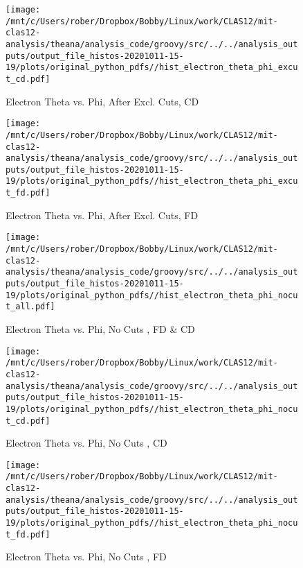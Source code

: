 \documentclass{article}
\begin{document}
\begin{landscape}
\begin{figure}[h]
        \texttt{[image: /mnt/c/Users/rober/Dropbox/Bobby/Linux/work/CLAS12/mit-clas12-analysis/theana/analysis\_code/groovy/src/../../analysis\_outputs/output\_file\_histos-20201011-15-19/plots/original\_python\_pdfs//hist\_electron\_theta\_phi\_excut\_cd.pdf]}
        \captionsetup{textformat=empty,labelformat=blank}
        \caption{Electron Theta vs. Phi, After Excl. Cuts, CD}
    \end{figure}
    \clearpage
    
    \begin{figure}[h]
        \centering

        \texttt{[image: /mnt/c/Users/rober/Dropbox/Bobby/Linux/work/CLAS12/mit-clas12-analysis/theana/analysis\_code/groovy/src/../../analysis\_outputs/output\_file\_histos-20201011-15-19/plots/original\_python\_pdfs//hist\_electron\_theta\_phi\_excut\_fd.pdf]}
        \captionsetup{textformat=empty,labelformat=blank}
        \caption{Electron Theta vs. Phi, After Excl. Cuts, FD}
    \end{figure}
    \clearpage
    
    \begin{figure}[h]
        \centering

        \texttt{[image: /mnt/c/Users/rober/Dropbox/Bobby/Linux/work/CLAS12/mit-clas12-analysis/theana/analysis\_code/groovy/src/../../analysis\_outputs/output\_file\_histos-20201011-15-19/plots/original\_python\_pdfs//hist\_electron\_theta\_phi\_nocut\_all.pdf]}
        \captionsetup{textformat=empty,labelformat=blank}
        \caption{Electron Theta vs. Phi, No Cuts , FD \& CD}
    \end{figure}
    \clearpage
    
    \begin{figure}[h]
        \centering

        \texttt{[image: /mnt/c/Users/rober/Dropbox/Bobby/Linux/work/CLAS12/mit-clas12-analysis/theana/analysis\_code/groovy/src/../../analysis\_outputs/output\_file\_histos-20201011-15-19/plots/original\_python\_pdfs//hist\_electron\_theta\_phi\_nocut\_cd.pdf]}
        \captionsetup{textformat=empty,labelformat=blank}
        \caption{Electron Theta vs. Phi, No Cuts , CD}
    \end{figure}
    \clearpage
    
    \begin{figure}[h]
        \centering

        \texttt{[image: /mnt/c/Users/rober/Dropbox/Bobby/Linux/work/CLAS12/mit-clas12-analysis/theana/analysis\_code/groovy/src/../../analysis\_outputs/output\_file\_histos-20201011-15-19/plots/original\_python\_pdfs//hist\_electron\_theta\_phi\_nocut\_fd.pdf]}
        \captionsetup{textformat=empty,labelformat=blank}
        \caption{Electron Theta vs. Phi, No Cuts , FD}
    \end{figure}
    \clearpage
    

\end{landscape}
\end{document}

